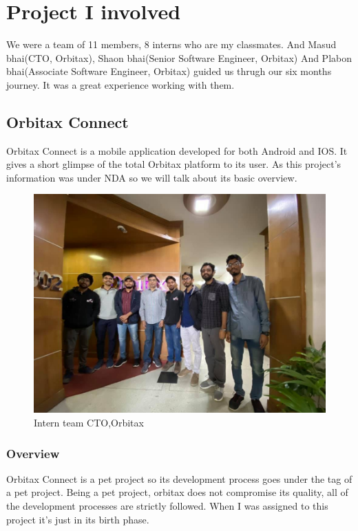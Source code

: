 
\chapter{Project I involved}
\begin{flushleft}
\label{ch:method}

We were a team of 11 members, 8 interns who are my classmates. And Masud bhai(CTO, Orbitax), Shaon bhai(Senior Software Engineer, Orbitax) And Plabon bhai(Associate Software Engineer, Orbitax) guided us thrugh our six months journey. It was a great experience working with them.


\section{Orbitax Connect}

Orbitax Connect is a mobile application developed for both Android and IOS. It gives a short glimpse of the total Orbitax platform to its user.
 As this project’s information was under NDA so we will talk about its basic overview.
  \begin{figure}[htbp]
\centerline{\includegraphics[scale=0.5]{Figures/interns.jpg}}
\caption{Intern team CTO,Orbitax}
\label{fig}
\end{figure}


\subsection{Overview}
Orbitax Connect is a pet project so its development process goes under the tag of a pet project. Being a pet project, orbitax does not compromise its quality, all of the development processes are strictly followed. When I was assigned to this project it’s just in its birth phase. 



\end{flushleft}

